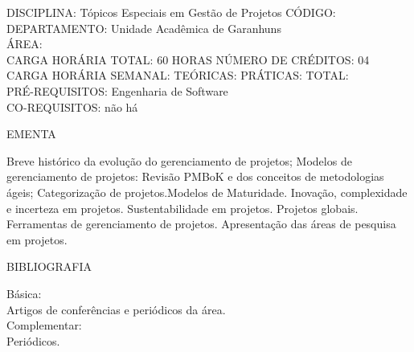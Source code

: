 \documentclass[
	12pt,				%
	openright,			%
  oneside,     %
	a4paper,			%
	chapter=TITLE,		%
	english,			%
	french,				%
	spanish,			%
	brazil				%
	]{abntex2}
\begin{document}
\begin{apendicesenv}
DISCIPLINA: Tópicos Especiais em Gestão de Projetos CÓDIGO:\\ 
DEPARTAMENTO: Unidade Acadêmica de Garanhuns\\ ÁREA: \\
CARGA HORÁRIA TOTAL: 60 HORAS NÚMERO DE CRÉDITOS: 04\\
CARGA HORÁRIA SEMANAL: TEÓRICAS: PRÁTICAS: TOTAL: \\
PRÉ-REQUISITOS: Engenharia de Software\\
CO-REQUISITOS: não há

EMENTA 

Breve histórico da evolução do gerenciamento de projetos; Modelos de
gerenciamento de projetos: Revisão PMBoK e dos conceitos de
metodologias ágeis; Categorização de projetos.Modelos de Maturidade.
Inovação, complexidade e incerteza em projetos. Sustentabilidade em
projetos. Projetos globais. Ferramentas de gerenciamento de projetos.
Apresentação das áreas de pesquisa em projetos.

BIBLIOGRAFIA 

Básica:\\
Artigos de conferências e periódicos da área.\\
Complementar:\\
Periódicos.

\end{apendicesenv}











\end{document}
